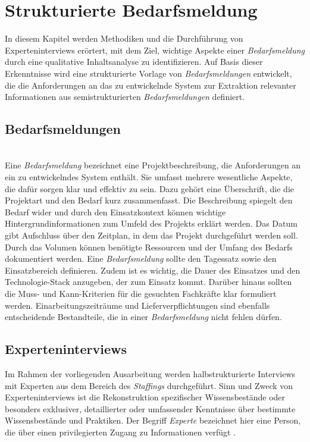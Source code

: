 \chapter{Strukturierte Bedarfsmeldung}
\label{chap:erwartungshaltung}
In diesem Kapitel werden Methodiken und die Durchführung von Experteninterviews erörtert, mit dem Ziel, wichtige Aspekte einer \emph{Bedarfsmeldung} durch eine qualitative Inhaltsanalyse zu identifizieren. Auf Basis dieser Erkenntnisse wird eine strukturierte Vorlage von \emph{Bedarfsmeldungen} entwickelt, die die Anforderungen an das zu entwickelnde System zur Extraktion relevanter Informationen aus semistrukturierten \emph{Bedarfsmeldungen} definiert.
\section{Bedarfsmeldungen}\mbox{} \\
Eine \emph{Bedarfsmeldung} bezeichnet eine Projektbeschreibung, die Anforderungen an ein zu entwickelndes System enthält. Sie umfasst mehrere wesentliche Aspekte, die dafür sorgen klar und effektiv zu sein. Dazu gehört eine Überschrift, die die Projektart und den Bedarf kurz zusammenfasst. Die Beschreibung spiegelt den Bedarf wider und durch den Einsatzkontext können wichtige Hintergrundinformationen zum Umfeld des Projekts erklärt werden. Das Datum gibt Aufschluss über den Zeitplan, in dem das Projekt durchgeführt werden soll. Durch das Volumen können benötigte Ressourcen und der Umfang des Bedarfs dokumentiert werden. Eine \emph{Bedarfsmeldung} sollte den Tagessatz sowie den Einsatzbereich definieren. Zudem ist es wichtig, die Dauer des Einsatzes und den Technologie-Stack anzugeben, der zum Einsatz kommt. Darüber hinaus sollten die Muss- und Kann-Kriterien für die gesuchten Fachkräfte klar formuliert werden. Einarbeitungszeiträume und Lieferverpflichtungen sind ebenfalls entscheidende Bestandteile, die in einer \emph{Bedarfsmeldung} nicht fehlen dürfen.\\
\section{Experteninterviews}
\label{sec:beschreibung-der-interviews}
Im Rahmen der vorliegenden Ausarbeitung werden halbstrukturierte Interviews mit Experten aus dem Bereich des \emph{Staffings} durchgeführt. Sinn und Zweck von Experteninterviews ist die Rekonstruktion spezifischer Wissensbestände oder besonders exklusiver, detaillierter oder umfassender Kenntnisse über bestimmte Wissensbestände und Praktiken. Der Begriff \emph{Experte} bezeichnet hier eine Person, die über einen privilegierten Zugang zu Informationen verfügt \cite{pfadenhauer2009eye}.\\ 

